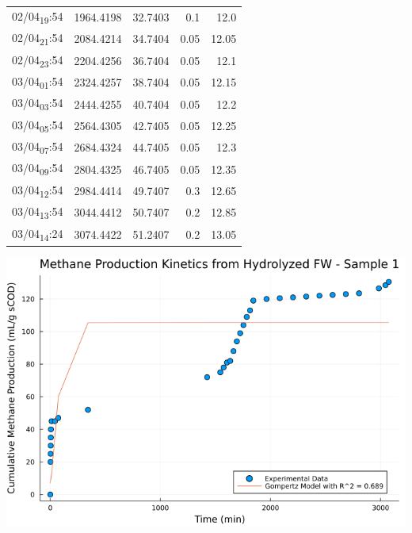 \documentclass[11pt]{article}
\begin{document}
\begin{center}
\begin{tabular}{lrrrr}
02/04\textsubscript{19}:54 & 1964.4198 & 32.7403 & 0.1 & 12.0\\[0pt]
02/04\textsubscript{21}:54 & 2084.4214 & 34.7404 & 0.05 & 12.05\\[0pt]
02/04\textsubscript{23}:54 & 2204.4256 & 36.7404 & 0.05 & 12.1\\[0pt]
03/04\textsubscript{01}:54 & 2324.4257 & 38.7404 & 0.05 & 12.15\\[0pt]
03/04\textsubscript{03}:54 & 2444.4255 & 40.7404 & 0.05 & 12.2\\[0pt]
03/04\textsubscript{05}:54 & 2564.4305 & 42.7405 & 0.05 & 12.25\\[0pt]
03/04\textsubscript{07}:54 & 2684.4324 & 44.7405 & 0.05 & 12.3\\[0pt]
03/04\textsubscript{09}:54 & 2804.4325 & 46.7405 & 0.05 & 12.35\\[0pt]
03/04\textsubscript{12}:54 & 2984.4414 & 49.7407 & 0.3 & 12.65\\[0pt]
03/04\textsubscript{13}:54 & 3044.4412 & 50.7407 & 0.2 & 12.85\\[0pt]
03/04\textsubscript{14}:24 & 3074.4422 & 51.2407 & 0.2 & 13.05\\[0pt]
\end{tabular}
\end{center}

\begin{center}
\includegraphics[width=.9\linewidth]{../plots/BMPs/Hydrolyzed FW/methane_kinetics_hydrolysate_1_min.png}
\end{center}
\end{document}

